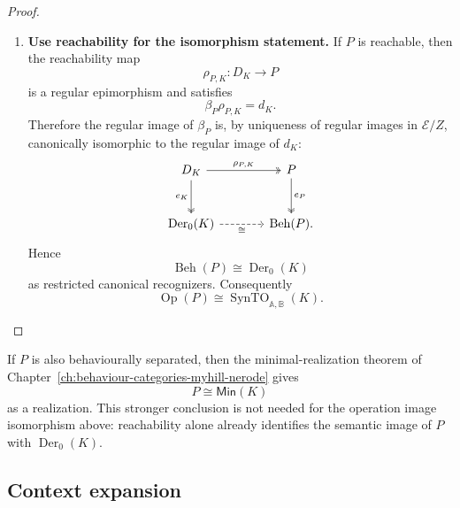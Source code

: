 \begin{proof}
\begin{enumerate}
        \item \textbf{Use reachability for the isomorphism statement.}
        If \(P\) is reachable, then the reachability map
        \[
            \rho_{P,K}:D_K\to P
        \]
        is a regular epimorphism and satisfies
        \[
            \beta_P\rho_{P,K}=d_K.
        \]
        Therefore the regular image of \(\beta_P\) is, by uniqueness of regular
        images in \(\mathcal E/Z\), canonically isomorphic to the regular image
        of \(d_K\):
        \[
        \begin{tikzcd}[column sep=large, row sep=large]
            D_K
                \arrow[r, two heads, "\rho_{P,K}"]
                \arrow[d, two heads, "e_K"']
            &
            P
                \arrow[d, two heads, "e_P"]
            \\
            \operatorname{Der}_0(K)
                \arrow[r, dashed, "\cong"']
            &
            \operatorname{Beh}(P).
        \end{tikzcd}
        \]
        Hence
        \[
            \operatorname{Beh}(P)\cong \operatorname{Der}_0(K)
        \]
        as restricted canonical recognizers. Consequently
        \[
            \operatorname{Op}(P)
            \cong
            \operatorname{SynTO}_{\mathbb A,\mathbb B}(K).
        \]
    \end{enumerate}
\end{proof}

\begin{remark}
\label{rem:separated-realizations-operation-image}
    If \(P\) is also behaviourally separated, then the minimal-realization
    theorem of Chapter~\ref{ch:behaviour-categories-myhill-nerode} gives
    \[
        P\cong \mathsf{Min}(K)
    \]
    as a realization. This stronger conclusion is not needed for the operation
    image isomorphism above: reachability alone already identifies the semantic
    image of \(P\) with \(\operatorname{Der}_0(K)\).
\end{remark}

\subsection{Context expansion}
\label{subsec:context-expansion}

